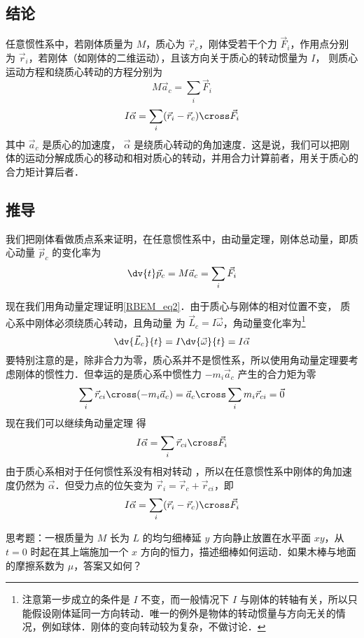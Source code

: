 

\subsection{结论}
任意惯性系中，若刚体质量为 $M$，质心为 $\vec r_c$，刚体受若干个力 $\vec F_i$，作用点分别为 $\vec r_i$，若刚体（如刚体的二维运动），且该方向关于质心的转动惯量为 $I$， 则质心运动方程和绕质心转动的方程分别为
\begin{equation}\label{RBEM_eq1}
M\vec a_c = \sum_i \vec F_i
\end{equation}
\begin{equation}\label{RBEM_eq2}
I \vec \alpha = \sum_i (\vec r_i-\vec r_c) \cross  \vec F_i
\end{equation}
其中 $\vec a_c$ 是质心的加速度， $\vec \alpha$ 是绕质心转动的角加速度．这是说，我们可以把刚体的运动分解成质心的移动和相对质心的转动，并用合力计算前者，用关于质心的合力矩计算后者．

\subsection{推导}
我们把刚体看做质点系来证明，在任意惯性系中，由动量定理，刚体总动量，即质心动量 $\vec p_c$ 的变化率为
\begin{equation}
\dv{t} \vec p_c = M \vec a_c = \sum_i \vec F_i
\end{equation}

现在我们用角动量定理证明\autoref{RBEM_eq2}．由于质心与刚体的相对位置不变，%
质心系中刚体必须绕质心转动，且角动量%
为 $\vec L_c = I \vec\omega$，角动量变化率为\footnote{注意第一步成立的条件是 $I$ 不变，而一般情况下 $I$ 与刚体的转轴有关，所以只能假设刚体延同一方向转动．唯一的例外是物体的转动惯量与方向无关的情况，例如球体．刚体的变向转动较为复杂，不做讨论．}
\begin{equation}
\dv{\vec L_c}{t} = I \dv{\vec \omega}{t} = I \vec\alpha
\end{equation}
要特别注意的是，除非合力为零，质心系并不是惯性系，所以使用角动量定理要考虑刚体的惯性力．但幸运的是质心系中惯性力%
 $-m_i \vec a_c$ 产生的合力矩为零%
\begin{equation}
\sum_i \vec r_{ci}\cross (-m_i \vec a_{c}) = \vec a_{c} \cross \sum_i m_i \vec r_{ci} = \vec 0
\end{equation}
现在我们可以继续角动量定理 得
\begin{equation}
I \vec\alpha = \sum_i \vec r_{ci} \cross  \vec F_i
\end{equation}
由于质心系相对于任何惯性系没有相对转动%
，所以在任意惯性系中刚体的角加速度仍然为 $\vec\alpha$．但受力点的位矢变为 $\vec r_i = \vec r_c + \vec r_{ci}$，即
\begin{equation}\label{RBEM_eq7}
I \vec \alpha = \sum_i (\vec r_i-\vec r_c) \cross  \vec F_i
\end{equation}


思考题：一根质量为 $M$ 长为 $L$ 的均匀细棒延 $y$ 方向静止放置在水平面 $xy$，从 $t=0$ 时起在其上端施加一个 $x$ 方向的恒力，描述细棒如何运动．如果木棒与地面的摩擦系数为 $\mu$，答案又如何？

